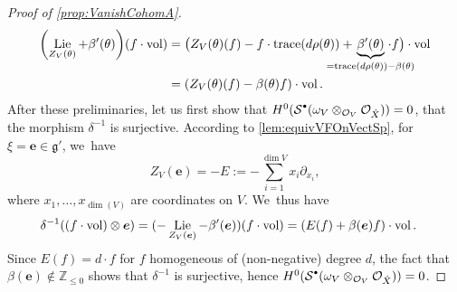 \documentclass[JEP,XML,SOM,Unicode,published]{cedram}
\let\mathds\mathbb
\newcommand{\sbullet}{{\scriptscriptstyle\bullet}}
\newcommand{\csbullet}{{\raisebox{1pt}{$\sbullet$}}}
\newcommand{\bme}{{\boldsymbol{e}}}
\newcommand{\dZ}{{\mathds Z}}\let\mbz\dZ\let\Z\dZ
\newcommand{\cO}{\mathcal{O}}\let\O\cO
\newcommand{\cS}{\mathcal{S}}
\newcommand{\frg}{\mathfrak{g}}
\DeclareMathOperator{\Lie}{\textup{Lie}}
\DeclareMathOperator{\vol}{\textup{vol}}
\let\originalleft\left
\let\originalright\right
\renewcommand{\left}{\mathopen{}\mathclose\bgroup\originalleft}
\renewcommand{\right}{\aftergroup\egroup\originalright}
\begin{document}
\begin{proof}[Proof of \cref{prop:VanishCohomA}]
\begin{equation}
\begin{aligned}
\left(\Lie_{Z_V(\theta)}+\beta'(\theta)\right)(f\cdot \vol)
&=
\big(Z_V(\theta)(f)-f\cdot\textup{trace}(d\rho(\theta))+\hspace*{-8mm}\underbrace{\beta'(\theta)}_{=\textup{trace}(d\rho(\theta))-\beta(\theta)}\hspace*{-8mm}\cdot f\big)\cdot\vol\\
&=\left(Z_V(\theta)(f)-\beta(\theta)f\right)\cdot \vol.
\end{aligned}
\end{equation}
After these preliminaries, let us first show that $H^0(\cS^{\csbullet}(\omega_V\otimes_{\cO_V} \cO_{\hat{X}}))=0$, \ie that the morphism $\delta^{-1}$ is surjective.
According to \cref{lem:equivVFOnVectSp}, for $\xi=\bme\in\frg'$, we~have
\[
Z_V(\bme)=-E:=-\sum_{i=1}^{\dim V} x_i\partial_{x_i},
\]
where $x_1,\ldots,x_{\dim(V)}$ are coordinates on $V$. We~thus have
\begin{align*}
\delta^{-1}\left((f\cdot\vol)\otimes\bme\right) &=
(-\Lie_{Z_V(\bme)}-\beta'(\bme))(f\cdot\vol)=
(E(f)+\beta(\bme)f)\cdot\vol.
\end{align*}
Since $E(f) =d \cdot f$ for $f$ homogeneous of (non-negative) degree $d$, the fact that $\beta(\bme)\notin\dZ_{\leq 0}$ shows that $\delta^{-1}$ is surjective, hence $H^0(\mathcal S^{\csbullet}(\omega_V\otimes_{\cO_V} \cO_{\hat{X}})) = 0$.


\end{proof}
\end{document}
